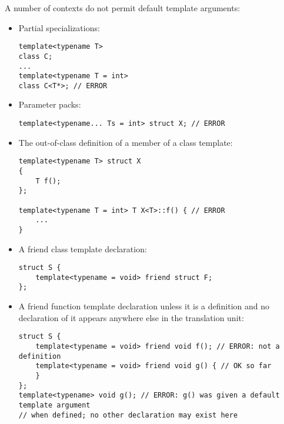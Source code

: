 A number of contexts do not permit default template arguments:

\begin{itemize}
\item 
Partial specializations:

\begin{lstlisting}[style=styleCXX]
template<typename T>
class C;
...
template<typename T = int>
class C<T*>; // ERROR
\end{lstlisting}

\item 
Parameter packs:

\begin{lstlisting}[style=styleCXX]
template<typename... Ts = int> struct X; // ERROR
\end{lstlisting}

\item 
The out-of-class definition of a member of a class template:

\begin{lstlisting}[style=styleCXX]
template<typename T> struct X
{
	T f();
};

template<typename T = int> T X<T>::f() { // ERROR
	...
}
\end{lstlisting}

\item 
A friend class template declaration:

\begin{lstlisting}[style=styleCXX]
struct S {
	template<typename = void> friend struct F;
};
\end{lstlisting}

\item 
A friend function template declaration unless it is a definition and no declaration of it appears anywhere else in the translation unit:

\begin{lstlisting}[style=styleCXX]
struct S {
	template<typename = void> friend void f(); // ERROR: not a definition
	template<typename = void> friend void g() { // OK so far
	}
};
template<typename> void g(); // ERROR: g() was given a default template argument
// when defined; no other declaration may exist here
\end{lstlisting}

\end{itemize}















